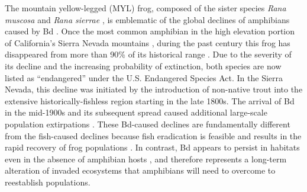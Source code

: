 \documentclass[9pt,twocolumn,twoside,lineno]{pnas-new}
\begin{document}
The mountain yellow-legged (MYL) frog, composed of the sister species
\emph{Rana muscosa} and \emph{Rana sierrae} \citep{vredenburg2007}, is
emblematic of the global declines of amphibians caused by Bd
\citep{scheele2019}. Once the most common amphibian in the high
elevation portion of California's Sierra Nevada mountains
\citep[USA,][]{grinnell1924}, during the past century this frog has
disappeared from more than 90\% of its historical range
\citep{vredenburg2007}. Due to the severity of its decline and the
increasing probability of extinction, both species are now listed as
``endangered'' under the U.S. Endangered Species Act. In the Sierra
Nevada, this decline was initiated by the introduction of non-native
trout into the extensive historically-fishless region
\citep{bradford1989, knapp2000} starting in the late 1800s. The arrival
of Bd in the mid-1900s and its subsequent spread \citep{vredenburg2019}
caused additional large-scale population extirpations
\citep{vredenburg2010, rachowicz2006}. These Bd-caused declines are
fundamentally different from the fish-caused declines because fish
eradication is feasible \citep{knapp1998} and results in the rapid
recovery of frog populations \citep{knapp2007, vredenburg2004}. In
contrast, Bd appears to persist in habitats even in the absence of
amphibian hosts \citep{walker2007}, and therefore represents a long-term
alteration of invaded ecosystems that amphibians will need to overcome
to reestablish populations.
\end{document}
